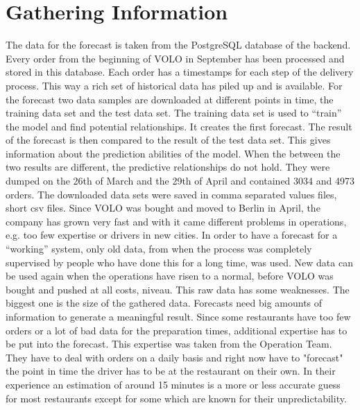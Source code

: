 \section{Gathering Information}\label{section:Gathering Information}
The data for the forecast is taken from the PostgreSQL database of the backend. Every order from the beginning of VOLO in September has been processed and stored in this database. Each order has a timestamps for each step of the delivery process. This way a rich set of historical data has piled up and is available. For the forecast two data samples are downloaded at different points in time, the training data set and the test data set. The training data set is used to “train” the model and find potential relationships. It creates the first forecast. The result of the forecast is then compared to the result of the test data set. This gives information about the prediction abilities of the model. When the between the two results are different, the predictive relationships do not hold. They were dumped on the 26th of March and the 29th of April and contained 3034 and 4973 orders. The downloaded data sets were saved in comma separated values files, short csv files. Since VOLO was bought and moved to Berlin in April, the company has grown very fast and with it came different problems in operations, e.g. too few expertise or drivers in new cities. In order to have a forecast for a “working” system, only old data, from when the process was completely supervised by people who have done this for a long time, was used. New data can be used again when the operations have risen to a normal, before VOLO was bought and pushed at all costs, niveau.\newline
This raw data has some weaknesses. The biggest one is the size of the gathered data. Forecasts need big amounts of information to generate a meaningful result. Since some restaurants have too few orders or a lot of bad data for the preparation times, additional expertise has to be put into the forecast. This expertise was taken from the Operation Team. They have to deal with orders on a daily basis and right now have to "forecast" the point in time the driver has to be at the restaurant on their own. In their experience an estimation of around 15 minutes is a more or less accurate guess for most restaurants except for some which are known for their unpredictability.\newline
